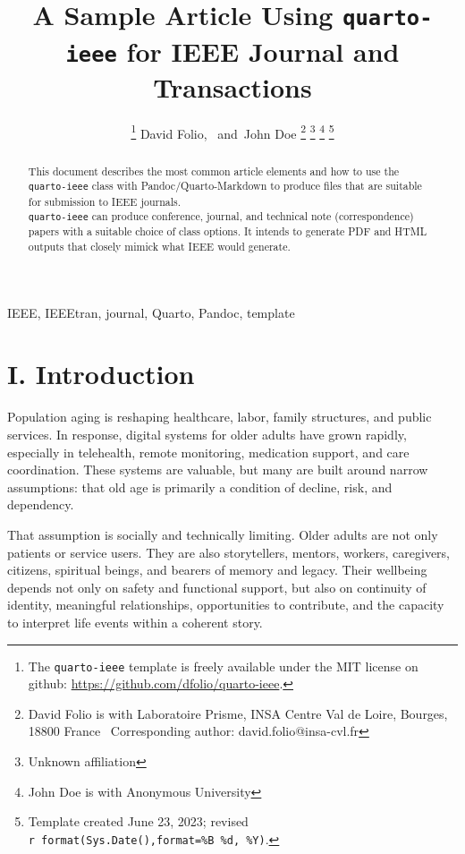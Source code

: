 \documentclass[
  journal,
]{IEEEtran}%
\title{A Sample Article Using \texttt{quarto-ieee} for IEEE Journal and
Transactions}
\author{
\thanks{The \texttt{quarto-ieee} template is freely available under the
MIT license on github: \url{https://github.com/dfolio/quarto-ieee}.}
David Folio\orcidlink{0000-0001-9430-6091},~\IEEEmembership{Member,
IEEE}
and~John Doe%
\thanks{David Folio is with Laboratoire Prisme, INSA Centre Val de
Loire, Bourges, 18800 France%
  Corresponding author: david.folio@insa-cvl.fr
}
\thanks{Unknown affiliation}
\thanks{John Doe is with Anonymous University%
}
\thanks{Template created June 23, 2023; revised
\texttt{r\ format(Sys.Date(),format=\textquotesingle{}\%B\ \%d,\ \%Y\textquotesingle{})}.}
}
\begin{document}


\maketitle

\begin{abstract}
This document describes the most common article elements and how to use
the \texttt{quarto-ieee} class with Pandoc/Quarto-Markdown to produce
files that are suitable for submission to IEEE journals.\\
\texttt{quarto-ieee} can produce conference, journal, and technical note
(correspondence) papers with a suitable choice of class options. It
intends to generate PDF and HTML outputs that closely mimick what IEEE
would generate.
\end{abstract}
\begin{IEEEkeywords}
IEEE, IEEEtran, journal, Quarto, Pandoc, template
\end{IEEEkeywords}

%


\section{I. Introduction}\label{i.-introduction}

Population aging is reshaping healthcare, labor, family structures, and
public services. In response, digital systems for older adults have
grown rapidly, especially in telehealth, remote monitoring, medication
support, and care coordination. These systems are valuable, but many are
built around narrow assumptions: that old age is primarily a condition
of decline, risk, and dependency.

That assumption is socially and technically limiting. Older adults are
not only patients or service users. They are also storytellers, mentors,
workers, caregivers, citizens, spiritual beings, and bearers of memory
and legacy. Their wellbeing depends not only on safety and functional
support, but also on continuity of identity, meaningful relationships,
opportunities to contribute, and the capacity to interpret life events
within a coherent story.
\end{document}
